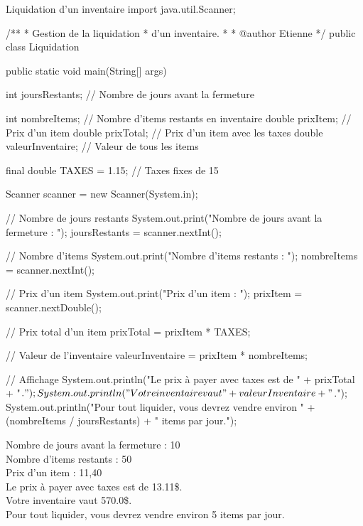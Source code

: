 \documentclass[12pt]{report}
\newenvironment{console}
	{
	\tcolorbox[title={Sortie console}, sharp corners = south, boxsep = 1.5mm]{} \tt
	}{\endtcolorbox}
\begin{document}
\begin{MyTCB}[breakable]{Liquidation d'un inventaire}
import java.util.Scanner;

/**
 * Gestion de la liquidation
 * d'un inventaire.
 * 
 * @author Etienne
 */
public class Liquidation {

	public static void main(String[] args) {
		
		int joursRestants; // Nombre de jours avant la fermeture
		
		int nombreItems; // Nombre d'items restants en inventaire
		double prixItem; // Prix d'un item
		double prixTotal; // Prix d'un item avec les taxes
		double valeurInventaire; // Valeur de tous les items
		
		final double TAXES = 1.15; // Taxes fixes de 15%
		
		Scanner scanner = new Scanner(System.in);
		
		
		// Nombre de jours restants
		System.out.print("Nombre de jours avant la fermeture : ");
		joursRestants = scanner.nextInt();
		
		// Nombre d'items
		System.out.print("Nombre d'items restants : ");
		nombreItems = scanner.nextInt();
		
		// Prix d'un item
		System.out.print("Prix d'un item : ");
		prixItem = scanner.nextDouble();
		
		// Prix total d'un item
		prixTotal = prixItem * TAXES;
		
		// Valeur de l'inventaire
		valeurInventaire = prixItem * nombreItems;
		
		// Affichage
		System.out.println("Le prix à payer avec taxes est de " + prixTotal + "$.");
		System.out.println("Votre inventaire vaut " + valeurInventaire + "$.");
		System.out.println("Pour tout liquider, vous devrez vendre environ " + (nombreItems / joursRestants) + " items par jour.");
		
	}
}
\end{MyTCB}
%
\begin{console}
Nombre de jours avant la fermeture : {\color{blue} 10}\\
Nombre d'items restants : {\color{blue} 50}\\
Prix d'un item : {\color{blue} 11,40}\\
Le prix à payer avec taxes est de 13.11\$.\\
Votre inventaire vaut 570.0\$.\\
Pour tout liquider, vous devrez vendre environ 5 items par jour.
\end{console}
\end{document}
